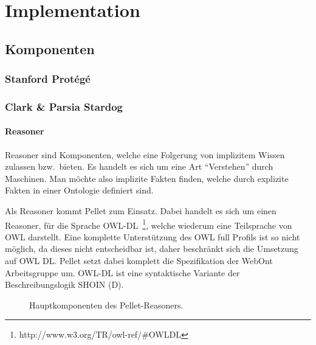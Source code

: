 \chapter{Implementation}
\label{chap:implementation}


\section{Komponenten}
\label{sec:komponenten}

\subsection{Stanford Protégé}
\label{subsec:protege}

\subsection{Clark \& Parsia Stardog}
\label{subsec:stardog}

\subsubsection{Reasoner}
\label{ssubsec:reasoner}
Reasoner sind Komponenten, welche eine Folgerung von implizitem Wissen zulassen bzw.\ bieten. Es handelt es sich um eine Art ``Verstehen'' durch Maschinen. Man möchte also implizite Fakten finden, welche durch explizite Fakten in einer Ontologie definiert sind. 

Als Reasoner kommt Pellet zum Einsatz. Dabei handelt es sich um einen Reasoner, für die Sprache OWL-DL~\footnote{http://www.w3.org/TR/owl-ref/\#OWLDL}, welche wiederum eine Teilsprache von OWL darstellt. Eine komplette Unterstützung des OWL full Profils ist so nicht möglich, da dieses nicht entscheidbar ist, daher beschränkt sich die Umsetzung auf OWL DL\@. Pellet setzt dabei komplett die Spezifikation der WebOnt Arbeitsgruppe um. OWL-DL ist eine syntaktische Variante der Beschreibungslogik SHOIN (D).

\begin{figure}[htbp]
\centering {}
\caption{Hauptkomponenten des Pellet-Reasoners.\label{fig:pellet_komponenten}\protect\footnotemark}
\end{figure}

